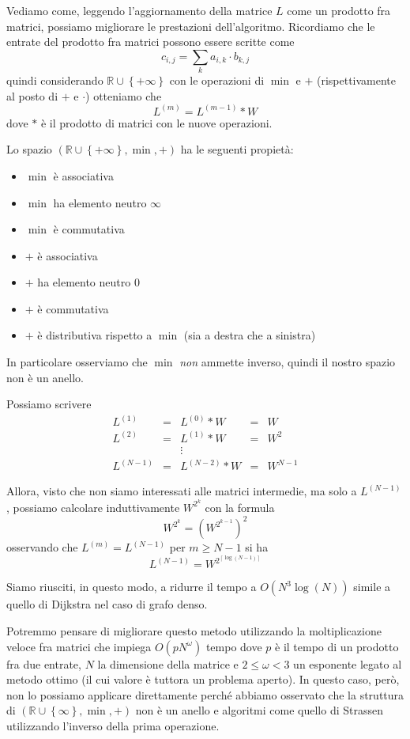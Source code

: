 \documentclass[a4paper,10pt]{amsbook}
\theoremstyle{plain}
\theoremstyle{definition}
\theoremstyle{remark}
\newcommand{\set}[1]{\left\{#1\right\}}
\newcommand{\pa}[1]{\left(#1\right)}
\newcommand{\ceil}[1]{\left\lceil#1\right\rceil}
\begin{document}
Vediamo come, leggendo l'aggiornamento della matrice $L$ come un
prodotto fra matrici, possiamo migliorare le prestazioni
dell'algoritmo. Ricordiamo che le entrate del prodotto fra matrici
possono essere scritte come
\[ c_{i,j} = \sum _k a_{i,k} \cdot b_{k,j} \] quindi considerando
$\mathbb{R}\cup \set{+\infty}$ con le operazioni di $\min$ e $+$
(rispettivamente al posto di $+$ e $\cdot$) otteniamo che
\[ L^{(m)} = L^{(m-1)} * W \]
dove $*$ è il prodotto di matrici con le nuove operazioni.

Lo spazio $\pa{\mathbb{R}\cup \set{+\infty} ,\min,+}$ ha le seguenti
propietà:
\begin{itemize}
\item $\min$ è associativa
\item $\min$ ha elemento neutro $\infty$
\item $\min$ è commutativa
\item $+$ è associativa
\item $+$ ha elemento neutro $0$
\item $+$ è commutativa
\item $+$ è distributiva rispetto a $\min$ (sia a destra che a sinistra)
\end{itemize}
In particolare osserviamo che $\min$ \emph{non} ammette inverso,
quindi il nostro spazio non \`e un anello.


Possiamo scrivere
\begin{align*}
  L^{(1)} & = & L^{(0)} * W & = & W \\
  L^{(2)} & = & L^{(1)} * W & = & W^2 \\
  & & \vdots & & \\
  L^{(N-1)} & = & L^{(N-2)} * W & = & W^{N-1} 
\end{align*}

Allora, visto che non siamo interessati alle matrici intermedie, ma
solo a $L^{(N-1)}$, possiamo calcolare induttivamente $W^{2^k}$ con la
formula
\[ W ^{2^k} = \pa{W ^{2^{k-1}}} ^2 \]
osservando che $L^{(m)} = L^{(N-1)}$ per $m \ge N-1$ si ha
\[ L^{(N-1)} = W^{2 ^{\ceil {\log \pa{ N-1} } } } \]

Siamo riusciti, in questo modo, a ridurre il tempo a $O\pa{ N^3 \log
  (N)}$
simile a quello di Dijkstra nel caso di grafo denso.

Potremmo pensare di migliorare questo metodo utilizzando la
moltiplicazione veloce fra matrici che impiega $O\pa{pN^\omega}$ tempo
dove $p$ è il tempo di un prodotto fra due entrate, $N$ la dimensione
della matrice e $2 \le \omega <3$ un esponente legato al metodo ottimo
(il cui valore \`e tuttora un problema aperto). In questo caso, però,
non lo possiamo applicare direttamente perché abbiamo osservato che la
struttura di $\pa{ \mathbb{R} \cup \set{\infty}, \min , +}$ non è un
anello e algoritmi come quello di Strassen utilizzando l'inverso della
prima operazione.
\end{document}
